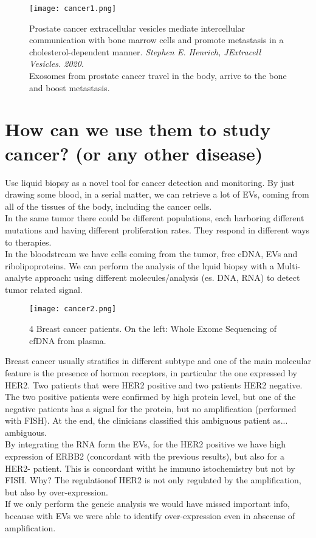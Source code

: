 \begin{figure}[H]
    \centering
    \texttt{[image: cancer1.png]}
    \caption{Prostate cancer extracellular vesicles mediate intercellular communication with bone marrow cells and promote metastasis in a cholesterol-dependent manner.\textit{ Stephen E. Henrich, JExtracell Vesicles. 2020}.
    \\
    Exosomes from prostate cancer travel in the body, arrive to the bone and boost metastasis. }
    \label{fig:cancer1}
\end{figure}


\section{How can we use them to study cancer? (or any other disease)}
Use liquid biopsy as a novel tool for cancer detection and monitoring. By just drawing some blood, in a serial matter, we can retrieve a lot of EVs, coming from all of the tissues of the body, including the cancer cells.
\\
In the same tumor there could be different populations, each harboring different mutations and having different proliferation rates. They respond in different ways to therapies.
\\
In the bloodstream we have cells coming from the tumor, free cDNA, EVs and ribolipoproteins. We can perform the analysis of the lquid biopsy with a Multi-analyte approach: using different molecules/analysis (es. DNA, RNA) to detect tumor related signal.
\\

\begin{figure}[H]
    \centering
    \texttt{[image: cancer2.png]}
    \caption{4 Breast cancer patients. On the left:  Whole Exome Sequencing of cfDNA from plasma. }
    \label{fig:cancer2}
\end{figure}

Breast cancer usually stratifies in different subtype and one of the main molecular feature is the presence of hormon receptors, in particular the one expressed by HER2.
Two patients that were HER2 positive and two patients HER2 negative. The two positive patients were confirmed by high protein level, but one of the negative patients has a signal for the protein, but no amplification (performed with FISH). At the end, the clinicians classified this ambiguous patient as... ambiguous.
\\
By integrating the RNA form the EVs, for the HER2 positive we have high expression of ERBB2 (concordant with the previous results), but also for a HER2- patient. This is concordant witht he immuno istochemistry but not by FISH. Why? The regulationof HER2 is not only regulated by the amplification, but also by over-expression.
\\
If we only perform the geneic analysis we would have missed important info, because with EVs we were able to identify over-expression even in abscense of amplification.

